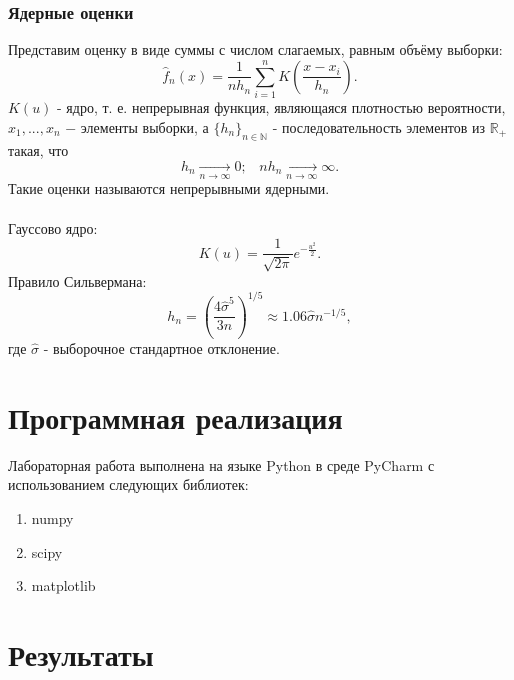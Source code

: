 \documentclass[a4paper]{article}
\begin{document}
		\subsubsection{Ядерные оценки}
			\noindent Представим оценку в виде суммы с числом слагаемых, равным объёму выборки:
			\begin{equation}
				\widehat{f}_n(x)=\frac{1}{n h_n}\sum_{i=1}^n K\left(\frac{x-x_i}{h_n}\right).
			\end{equation}
			$K(u)$ - ядро, т. е. непрерывная функция, являющаяся плотностью вероятности, $x_1,...,x_n$ $-$ элементы выборки, а $\{h_n\}_{n\in\mathbb{N}}$ - последовательность элементов из $\mathbb{R}_+$ такая, что
			\begin{equation}
				h_n\xrightarrow[n\to\infty]{}0;\;\;\;n h_n\xrightarrow[n\to\infty]{}\infty.
			\end{equation}
			Такие оценки называются непрерывными ядерными.\\\\
			Гауссово ядро:
			\begin{equation}
				K(u)=\frac{1}{\sqrt{2\pi}}e^{-\frac{u^2}{2}}.
			\end{equation}
			Правило Сильвермана:
			\begin{equation}
				h_n=\left(\frac{4\hat{\sigma}^5}{3n}\right)^{1/5}\approx1.06\hat{\sigma}n^{-1/5},
			\end{equation}
			где $\hat{\sigma}$ - выборочное стандартное отклонение.
\section{Программная реализация}
Лабораторная работа выполнена на языке Python в среде PyCharm с использованием следующих библиотек:
\begin{enumerate}
    \item numpy
    \item scipy
    \item matplotlib
\end{enumerate}


\section {Результаты}
\end{document}

